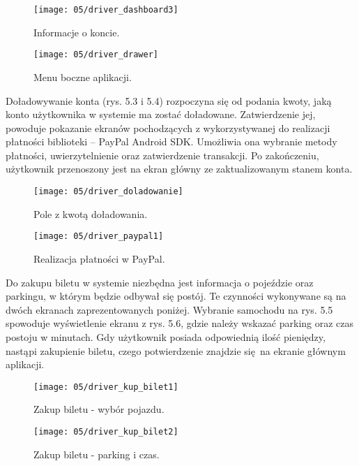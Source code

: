 \begin{figure}[h]
	\centering
	\begin{minipage}[b]{0.25\textwidth}
		\texttt{[image: 05/driver\_dashboard3]}
		\caption{Informacje o koncie.}
	\end{minipage}
	\hspace{3cm}
	\begin{minipage}[b]{0.25\textwidth}
		\texttt{[image: 05/driver\_drawer]}
		\caption{Menu boczne aplikacji.}
	\end{minipage}
\end{figure}

Doładowywanie konta (rys. 5.3 i 5.4) rozpoczyna się od podania kwoty, jaką konto użytkownika w systemie ma zostać doładowane. Zatwierdzenie jej, powoduje pokazanie ekranów pochodzących z wykorzystywanej do realizacji płatności biblioteki -- PayPal Android SDK. Umożliwia ona wybranie metody płatności, uwierzytelnienie oraz zatwierdzenie transakcji. Po zakończeniu, użytkownik przenoszony jest na ekran główny ze zaktualizowanym stanem konta.

\newpage

\begin{figure}[h!]
	\centering
	\begin{minipage}[b]{0.25\textwidth}
		\texttt{[image: 05/driver\_doladowanie]}
		\caption{Pole z kwotą doładowania.}
	\end{minipage}
	\hspace{3cm}
	\begin{minipage}[b]{0.25\textwidth}
		\texttt{[image: 05/driver\_paypal1]}
		\caption{Realizacja płatności w PayPal.}
	\end{minipage}
\end{figure}

Do zakupu biletu w systemie niezbędna jest informacja o pojeździe oraz parkingu, w którym będzie odbywał się postój. Te czynności wykonywane są na dwóch ekranach zaprezentowanych poniżej. Wybranie samochodu na rys. 5.5 spowoduje wyświetlenie ekranu z rys. 5.6, gdzie należy wskazać parking oraz czas postoju w minutach. Gdy użytkownik posiada odpowiednią ilość pieniędzy, nastąpi zakupienie biletu, czego potwierdzenie znajdzie się na ekranie głównym aplikacji.

\begin{figure}[h!]
	\centering
	\begin{minipage}[b]{0.25\textwidth}
		\texttt{[image: 05/driver\_kup\_bilet1]}
		\caption{Zakup biletu - wybór pojazdu.}
	\end{minipage}
	\hspace{3cm}
	\begin{minipage}[b]{0.25\textwidth}
		\texttt{[image: 05/driver\_kup\_bilet2]}
		\caption{Zakup biletu - parking i czas.}
	\end{minipage}
\end{figure}

